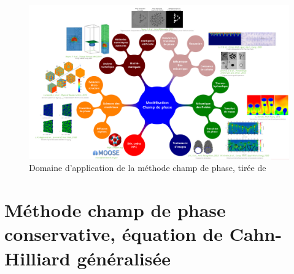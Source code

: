 \begin{figure}[H]
	\centering
	\includegraphics[width=1\linewidth]{figure/champ_phase}
	\caption[Domaine d'application de la méthode champ de phase]{Domaine d'application de la méthode champ de phase, tirée de \cite{introini_suivi_nodate}}
	\label{fig:champphase}
\end{figure} 





\section{Méthode champ de phase conservative, équation de Cahn-Hilliard généralisée}

